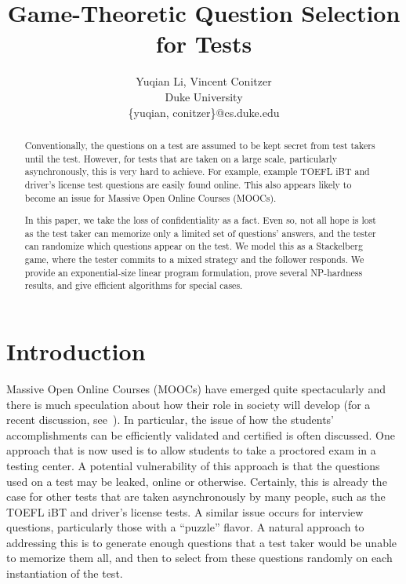 \documentclass{article}
\title{Game-Theoretic Question Selection for Tests}
\author{Yuqian Li, Vincent Conitzer\\
Duke University\\
\{yuqian, conitzer\}@cs.duke.edu}
\begin{document}
\maketitle

\begin{abstract}
Conventionally, the questions on a test are assumed to be kept secret
from test takers until the test.  However, for tests that are taken on
a large scale, particularly asynchronously, this is very hard to
achieve.  For example, example TOEFL iBT and driver's license test
questions are easily found online.  This also appears likely to become
an issue for Massive Open Online Courses (MOOCs).

In this paper, we take the loss of confidentiality as a fact.  Even
so, not all hope is lost as the test taker can memorize only a limited
set of questions' answers, and the tester can randomize which questions appear on
the test.  We model this as a Stackelberg game, where the tester
commits to a mixed strategy and the follower responds.  We provide an
exponential-size linear program formulation, prove several NP-hardness
results, and give efficient algorithms for special cases.
\end{abstract}

\section{Introduction}
Massive Open Online Courses (MOOCs) have emerged quite spectacularly
and there is much speculation about how their role in society will
develop (for a recent discussion, see~\cite{Cooper13:Reflections}).
In particular, the issue of how the students' accomplishments can be
efficiently validated and certified is often discussed.  One approach
that is now used is to allow students to take a proctored exam in a
testing center.  A potential vulnerability of this approach is that
the questions used on a test may be leaked, online or otherwise.
Certainly, this is already the case for other tests that are taken
asynchronously by many people, such as the TOEFL iBT and driver's
license tests.  A similar issue occurs for interview questions,
particularly those with a ``puzzle'' flavor.  A natural approach to
addressing this is to generate enough questions that a test taker
would be unable to memorize them all, and then to select from these
questions randomly on each instantiation of the test.
\end{document}
